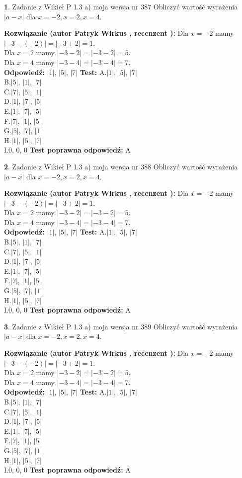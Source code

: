 \documentclass[12pt, a4paper]{article}
\theoremstyle{definition} %
\newtheorem{zad}{}
\newcommand{\zadStart}[1]{\begin{zad}#1\newline}
\newcommand{\zadStop}{\end{zad}}
\newcommand{\rozwStart}[2]{\noindent \textbf{Rozwiązanie (autor #1 , recenzent #2): }\newline}
\newcommand{\rozwStop}{\newline}
\newcommand{\odpStart}{\noindent \textbf{Odpowiedź:}\newline}
\newcommand{\odpStop}{\newline}
\newcommand{\testStart}{\noindent \textbf{Test:}\newline}
\newcommand{\testStop}{\newline}
\newcommand{\kluczStart}{\noindent \textbf{Test poprawna odpowiedź:}\newline}
\newcommand{\kluczStop}{\newline}
\begin{document}
\zadStart{Zadanie z Wikieł P 1.3 a) moja wersja nr 387}
Obliczyć wartość wyrażenia $|a - x|$ dla $x=-2,x=2,x=4$.
\zadStop
\rozwStart{Patryk Wirkus}{}
Dla $x = -2$ mamy $|-3 - (-2)| = |-3 + 2| = 1$.\\
Dla $x = 2$ mamy $|-3 - 2| = |-3 - 2| = 5$.\\
Dla $x = 4$ mamy $|-3 - 4| = |-3 - 4| = 7$.\\
\rozwStop
\odpStart
$|1|$, $|5|$, $|7|$
\odpStop
\testStart
A.$|1|$, $|5|$, $|7|$\\
B.$|5|$, $|1|$, $|7|$\\
C.$|7|$, $|5|$, $|1|$\\
D.$|1|$, $|7|$, $|5|$\\
E.$|1|$, $|7|$, $|5|$\\
F.$|7|$, $|1|$, $|5|$\\
G.$|5|$, $|7|$, $|1|$\\
H.$|1|$, $|5|$, $|7|$\\
I.$0$, $0$, $0$
\testStop
\kluczStart
A
\kluczStop



\zadStart{Zadanie z Wikieł P 1.3 a) moja wersja nr 388}
Obliczyć wartość wyrażenia $|a - x|$ dla $x=-2,x=2,x=4$.
\zadStop
\rozwStart{Patryk Wirkus}{}
Dla $x = -2$ mamy $|-3 - (-2)| = |-3 + 2| = 1$.\\
Dla $x = 2$ mamy $|-3 - 2| = |-3 - 2| = 5$.\\
Dla $x = 4$ mamy $|-3 - 4| = |-3 - 4| = 7$.\\
\rozwStop
\odpStart
$|1|$, $|5|$, $|7|$
\odpStop
\testStart
A.$|1|$, $|5|$, $|7|$\\
B.$|5|$, $|1|$, $|7|$\\
C.$|7|$, $|5|$, $|1|$\\
D.$|1|$, $|7|$, $|5|$\\
E.$|1|$, $|7|$, $|5|$\\
F.$|7|$, $|1|$, $|5|$\\
G.$|5|$, $|7|$, $|1|$\\
H.$|1|$, $|5|$, $|7|$\\
I.$0$, $0$, $0$
\testStop
\kluczStart
A
\kluczStop



\zadStart{Zadanie z Wikieł P 1.3 a) moja wersja nr 389}
Obliczyć wartość wyrażenia $|a - x|$ dla $x=-2,x=2,x=4$.
\zadStop
\rozwStart{Patryk Wirkus}{}
Dla $x = -2$ mamy $|-3 - (-2)| = |-3 + 2| = 1$.\\
Dla $x = 2$ mamy $|-3 - 2| = |-3 - 2| = 5$.\\
Dla $x = 4$ mamy $|-3 - 4| = |-3 - 4| = 7$.\\
\rozwStop
\odpStart
$|1|$, $|5|$, $|7|$
\odpStop
\testStart
A.$|1|$, $|5|$, $|7|$\\
B.$|5|$, $|1|$, $|7|$\\
C.$|7|$, $|5|$, $|1|$\\
D.$|1|$, $|7|$, $|5|$\\
E.$|1|$, $|7|$, $|5|$\\
F.$|7|$, $|1|$, $|5|$\\
G.$|5|$, $|7|$, $|1|$\\
H.$|1|$, $|5|$, $|7|$\\
I.$0$, $0$, $0$
\testStop
\kluczStart
A
\kluczStop
\end{document}
